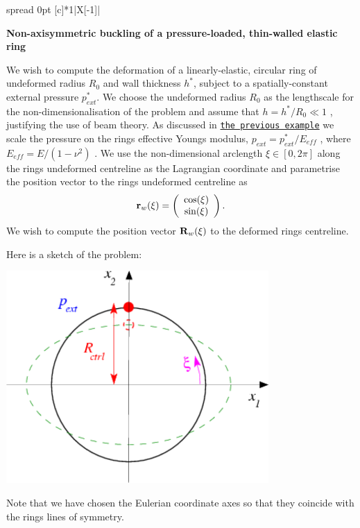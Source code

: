 \begin{center} \tabulinesep=1mm
\begin{longtabu} spread 0pt [c]{*{1}{|X[-1]}|}
\hline
~\newline
\begin{center} {\bfseries Non-\/axisymmetric buckling of a pressure-\/loaded, thin-\/walled elastic ring} \end{center} 

We wish to compute the deformation of a linearly-\/elastic, circular ring of undeformed radius $ R_0 $ and wall thickness $ h^* $, subject to a spatially-\/constant external pressure $ p_{ext}^* $. We choose the undeformed radius $ R_0 $ as the lengthscale for the non-\/dimensionalisation of the problem and assume that $ h = h^*/R_0 \ll 1 $ , justifying the use of beam theory. As discussed in \href{../../tensioned_string/html/index.html}{\tt the previous example} we scale the pressure on the ring\textquotesingle{}s effective Young\textquotesingle{}s modulus, $ p_{ext} = p_{ext}^*/E_{eff} $ , where $ E_{eff} = E/(1-\nu^2) $ . We use the non-\/dimensional arclength $ \xi \in [0,2\pi] $ along the ring\textquotesingle{}s undeformed centreline as the Lagrangian coordinate and parametrise the position vector to the ring\textquotesingle{}s undeformed centreline as \[ {\bf r}_w(\xi) = \left( \begin{array}{c} \cos(\xi) \\ \sin(\xi) \end{array} \right). \] We wish to compute the position vector $ {\bf R}_w(\xi) $ to the deformed ring\textquotesingle{}s centreline.

Here is a sketch of the problem\+:

 
\begin{DoxyImage}
\includegraphics[width=0.75\textwidth]{ring_sketch}
\end{DoxyImage}


Note that we have chosen the Eulerian coordinate axes so that they coincide with the ring\textquotesingle{}s lines of symmetry.

\\
\end{longtabu}
\end{center} 



